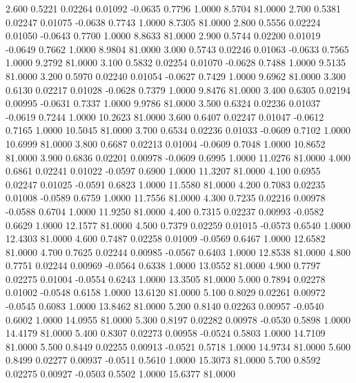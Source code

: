    2.600   0.5221   0.02264   0.01092  -0.0635   0.7796   1.0000   8.5704  81.0000
   2.700   0.5381   0.02247   0.01075  -0.0638   0.7743   1.0000   8.7305  81.0000
   2.800   0.5556   0.02224   0.01050  -0.0643   0.7700   1.0000   8.8633  81.0000
   2.900   0.5744   0.02200   0.01019  -0.0649   0.7662   1.0000   8.9804  81.0000
   3.000   0.5743   0.02246   0.01063  -0.0633   0.7565   1.0000   9.2792  81.0000
   3.100   0.5832   0.02254   0.01070  -0.0628   0.7488   1.0000   9.5135  81.0000
   3.200   0.5970   0.02240   0.01054  -0.0627   0.7429   1.0000   9.6962  81.0000
   3.300   0.6130   0.02217   0.01028  -0.0628   0.7379   1.0000   9.8476  81.0000
   3.400   0.6305   0.02194   0.00995  -0.0631   0.7337   1.0000   9.9786  81.0000
   3.500   0.6324   0.02236   0.01037  -0.0619   0.7244   1.0000  10.2623  81.0000
   3.600   0.6407   0.02247   0.01047  -0.0612   0.7165   1.0000  10.5045  81.0000
   3.700   0.6534   0.02236   0.01033  -0.0609   0.7102   1.0000  10.6999  81.0000
   3.800   0.6687   0.02213   0.01004  -0.0609   0.7048   1.0000  10.8652  81.0000
   3.900   0.6836   0.02201   0.00978  -0.0609   0.6995   1.0000  11.0276  81.0000
   4.000   0.6861   0.02241   0.01022  -0.0597   0.6900   1.0000  11.3207  81.0000
   4.100   0.6955   0.02247   0.01025  -0.0591   0.6823   1.0000  11.5580  81.0000
   4.200   0.7083   0.02235   0.01008  -0.0589   0.6759   1.0000  11.7556  81.0000
   4.300   0.7235   0.02216   0.00978  -0.0588   0.6704   1.0000  11.9250  81.0000
   4.400   0.7315   0.02237   0.00993  -0.0582   0.6629   1.0000  12.1577  81.0000
   4.500   0.7379   0.02259   0.01015  -0.0573   0.6540   1.0000  12.4303  81.0000
   4.600   0.7487   0.02258   0.01009  -0.0569   0.6467   1.0000  12.6582  81.0000
   4.700   0.7625   0.02244   0.00985  -0.0567   0.6403   1.0000  12.8538  81.0000
   4.800   0.7751   0.02244   0.00969  -0.0564   0.6338   1.0000  13.0552  81.0000
   4.900   0.7797   0.02275   0.01004  -0.0554   0.6243   1.0000  13.3505  81.0000
   5.000   0.7894   0.02278   0.01002  -0.0548   0.6158   1.0000  13.6120  81.0000
   5.100   0.8029   0.02261   0.00972  -0.0545   0.6083   1.0000  13.8462  81.0000
   5.200   0.8140   0.02263   0.00957  -0.0540   0.6002   1.0000  14.0955  81.0000
   5.300   0.8197   0.02282   0.00978  -0.0530   0.5898   1.0000  14.4179  81.0000
   5.400   0.8307   0.02273   0.00958  -0.0524   0.5803   1.0000  14.7109  81.0000
   5.500   0.8449   0.02255   0.00913  -0.0521   0.5718   1.0000  14.9734  81.0000
   5.600   0.8499   0.02277   0.00937  -0.0511   0.5610   1.0000  15.3073  81.0000
   5.700   0.8592   0.02275   0.00927  -0.0503   0.5502   1.0000  15.6377  81.0000
